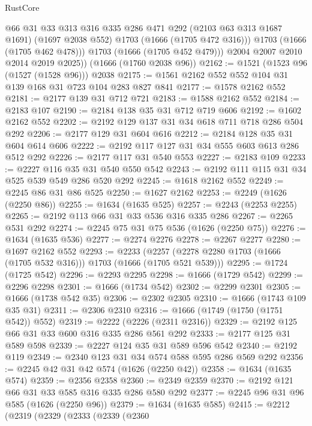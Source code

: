 \begin{lexlean}{RustCore}
\begin{coremodule}
              @66
              @31
              @33
              @313
              @316
              @335
              @286
              @471
              @292
              (@2103 @63 @313 @1687 @1691)
              (@1697 @2038 @552)
              @1703
              (@1666 (@1705 @472 @316)))
            @1703
            (@1666 (@1705 @462 @478)))
          @1703
          (@1666 (@1705 @452 @479)))
        @2004
        @2007
        @2010
        @2014
        @2019
        @2025))
    (@1666 (@1760 @2038 @96))
@2162 := @1521 (@1523 @96 (@1527 (@1528 @96))) @2038
@2175 := @1561 @2162 @552 @552 @104 @31 @139 @168 @31 @723 @104 @283 @827 @841
@2177 := @1578 @2162 @552
@2181 := @2177 @139 @31 @712 @721
@2183 := @1588 @2162 @552
@2184 := @2183 @107
@2190 := @2184 @138 @35 @31 @712 @719 @606
@2192 := @1602 @2162 @552
@2202 := @2192 @129 @137 @31 @34 @618 @711 @718 @286 @504 @292
@2206 := @2177 @129 @31 @604 @616
@2212 := @2184 @128 @35 @31 @604 @614 @606
@2222 := @2192 @117 @127 @31 @34 @555 @603 @613 @286 @512 @292
@2226 := @2177 @117 @31 @540 @553
@2227 := @2183 @109
@2233 := @2227 @116 @35 @31 @540 @550 @542
@2243 := @2192 @111 @115 @31 @34 @525 @539 @549 @286 @520 @292
@2245 := @1618 @2162 @552
@2249 := @2245 @86 @31 @86 @525
@2250 := @1627 @2162
@2253 := @2249 (@1626 (@2250 @86))
@2255 := @1634 (@1635 @525)
@2257 := @2243 (@2253 @2255)
@2265 := @2192 @113 @66 @31 @33 @536 @316 @335 @286
@2267 := @2265 @531 @292
@2274 := @2245 @75 @31 @75 @536 (@1626 (@2250 @75))
@2276 := @1634 (@1635 @536)
@2277 := @2274 @2276
@2278 := @2267 @2277
@2280 := @1697 @2162 @552
@2293 := @2233 (@2257 (@2278 @2280 @1703 (@1666 (@1705 @532 @316))) @1703 (@1666 (@1705 @521 @539)))
@2295 := @1724 (@1725 @542)
@2296 := @2293 @2295
@2298 := @1666 (@1729 @542)
@2299 := @2296 @2298
@2301 := @1666 (@1734 @542)
@2302 := @2299 @2301
@2305 := @1666 (@1738 @542 @35)
@2306 := @2302 @2305
@2310 := @1666 (@1743 @109 @35 @31)
@2311 := @2306 @2310
@2316 := @1666 (@1749 (@1750 (@1751 @542)) @552)
@2319 := @2222 (@2226 (@2311 @2316))
@2329 := @2192 @125 @66 @31 @33 @600 @316 @335 @286 @561 @292
@2333 := @2177 @125 @31 @589 @598
@2339 := @2227 @124 @35 @31 @589 @596 @542
@2340 := @2192 @119
@2349 := @2340 @123 @31 @34 @574 @588 @595 @286 @569 @292
@2356 := @2245 @42 @31 @42 @574 (@1626 (@2250 @42))
@2358 := @1634 (@1635 @574)
@2359 := @2356 @2358
@2360 := @2349 @2359
@2370 := @2192 @121 @66 @31 @33 @585 @316 @335 @286 @580 @292
@2377 := @2245 @96 @31 @96 @585 (@1626 (@2250 @96))
@2379 := @1634 (@1635 @585)
@2415 := @2212
    (@2319
      (@2329
        (@2333
          (@2339
            (@2360

\end{coremodule}
\end{lexlean}
